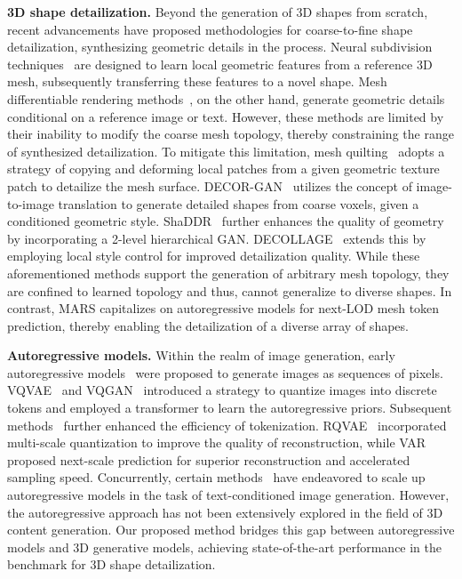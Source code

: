 \noindent\textbf{3D shape detailization.}
Beyond the generation of 3D shapes from scratch, recent advancements have proposed methodologies for coarse-to-fine shape detailization, synthesizing geometric details in the process. Neural subdivision techniques~\cite{DBLP:journals/tog/LiuKCAJ20, 3DStyleNet} are designed to learn local geometric features from a reference 3D mesh, subsequently transferring these features to a novel shape. Mesh differentiable rendering methods~\cite{DBLP:journals/tog/LiuTJ18, Text2Mesh}, on the other hand, generate geometric details conditional on a reference image or text. However, these methods are limited by their inability to modify the coarse mesh topology, thereby constraining the range of synthesized detailization. To mitigate this limitation, mesh quilting~\cite{DBLP:journals/tog/ZhouHWTDGS06} adopts a strategy of copying and deforming local patches from a given geometric texture patch to detailize the mesh surface. DECOR-GAN~\cite{decorgan} utilizes the concept of image-to-image translation to generate detailed shapes from coarse voxels, given a conditioned geometric style. ShaDDR~\cite{shaddr} further enhances the quality of geometry by incorporating a 2-level hierarchical GAN. DECOLLAGE~\cite{DECOLLAGE} extends this by employing local style control for improved detailization quality. While these aforementioned methods support the generation of arbitrary mesh topology, they are confined to learned topology and thus, cannot generalize to diverse shapes. In contrast, MARS capitalizes on autoregressive models for next-LOD mesh token prediction, thereby enabling the detailization of a diverse array of shapes.

\noindent\textbf{Autoregressive models.}
Within the realm of image generation, early autoregressive models~\cite{pixelcnn,pixelcnnplus} were proposed to generate images as sequences of pixels. VQVAE~\cite{vqvae} and VQGAN~\cite{vqgan} introduced a strategy to quantize images into discrete tokens and employed a transformer to learn the autoregressive priors. Subsequent methods~\cite{maskgit,DBLP:journals/corr/abs-2406-07550} further enhanced the efficiency of tokenization. RQVAE~\cite{rqvae} incorporated multi-scale quantization to improve the quality of reconstruction, while VAR~\cite{var} proposed next-scale prediction for superior reconstruction and accelerated sampling speed. Concurrently, certain methods~\cite{DBLP:conf/icml/RameshPGGVRCS21,DBLP:journals/corr/abs-2406-06525} have endeavored to scale up autoregressive models in the task of text-conditioned image generation. However, the autoregressive approach has not been extensively explored in the field of 3D content generation. Our proposed method bridges this gap between autoregressive models and 3D generative models, achieving state-of-the-art performance in the benchmark for 3D shape detailization.
